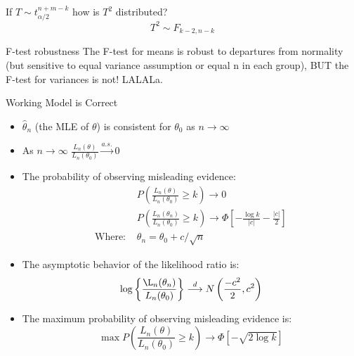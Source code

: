 \documentclass[avery5388,grid,frame]{flashcards}
\begin{document}
\begin{flashcard}{If $T\sim t_{\alpha/2}^{n+m-k}$ how is $T^2$ distributed?}
\bigskip\bigskip\bigskip\bigskip
\begin{equation*}
T^2\sim F_{k-2,n-k}
\end{equation*}
\end{flashcard}
\begin{flashcard}{F-test robustness}
\bigskip\bigskip\bigskip\bigskip
The F-test for means is robust to departures from normality (but sensitive to equal variance assumption or equal n in each group), BUT the F-test for variances is not! LALALa.
\end{flashcard}
\begin{flashcard}{Working Model is Correct}
\footnotesize{\begin{itemize}
\item $\hat{\theta}_n$ (the MLE of $\theta$) is consistent for $\theta_0$ as $n\rightarrow\infty$
\item As $n\rightarrow \infty$ $\frac{L_n(\theta)}{L_n(\theta_0)}\overset{a.s.}{\longrightarrow} 0$
\item The probability of observing misleading evidence:
{\begin{align*}
&P\left(\frac{L_n(\theta)}{L_n(\theta_0)}\geq k\right)\rightarrow 0\\
&P\left(\frac{L_n(\theta_n)}{L_n(\theta_0)}\geq k\right)\rightarrow \Phi\left[-\frac{\log k}{|c|}-\frac{|c|}{2}\right]\\
\textrm{Where: }&\theta_n=\theta_0+c/\sqrt{n}
\end{align*}}
\item The asymptotic behavior of the likelihood ratio is:
\begin{equation*}
\log\left\{\frac{\L_n(\theta_n)}{L_n(\theta_0)}\right\}\overset{d}{\longrightarrow}N\left(\frac{-c^2}{2},c^2\right)
\end{equation*}
\item The maximum probability of observing misleading evidence is:
\begin{equation*}
\max P\left(\frac{L_n(\theta)}{L_n(\theta_0)}\geq k\right)\rightarrow \Phi\left[-\sqrt{2\log k}\right]
\end{equation*}
\end{itemize}}
\end{flashcard}
\end{document}

